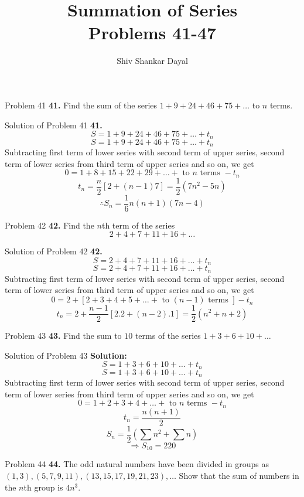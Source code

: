 \documentclass[aspectratio=1610,8pt]{beamer}
\title{Summation of Series\\Problems 41-47}
\author[Shiv Shankar Dayal]{Shiv Shankar Dayal}
\begin{document}
\begin{frame}
  \titlepage
\end{frame}
\begin{frame}{Problem 41}
  \textbf{41.} Find the sum of the series $1 + 9 + 24 + 46 + 75 + \ldots$ to $n$ terms.
\end{frame}
\begin{frame}{Solution of Problem 41}
  \textbf{41.} $$S = 1 + 9 + 24 + 46 + 75 + \ldots + t_n$$
  $$S = 1 + 9 + 24 + 46 + 75 + \ldots + t_n$$
  Subtracting first term of lower series with second term of upper series, second term of lower series from third term of upper
  series and so on, we get
  $$0= 1 + 8 + 15 + 22 + 29 + \ldots + \text{~to~}n\text{~terms~} - t_n$$
  $$t_n = \frac{n}{2}[2 + (n - 1)7] = \frac{1}{2}(7n^2 - 5n)$$
  $$\therefore S_n = \frac{1}{6}n(n + 1)(7n- 4)$$
\end{frame}
\begin{frame}{Problem 42}
  \textbf{42.} Find the $n$th term of the series $$2 + 4 + 7 + 11 + 16 + \ldots$$
\end{frame}
\begin{frame}{Solution of Problem 42}
  \textbf{42.} $$S = 2 + 4 + 7 + 11 + 16 + \ldots + t_n$$
  $$S = 2 + 4 + 7 + 11 + 16 + \ldots + t_n$$
  Subtracting first term of lower series with second term of upper series, second term of lower series from third term of upper
  series and so on, we get
  $$0 = 2 + [2 + 3 + 4 + 5 + \ldots + \text{~to~}(n - 1)\text{~terms~}] - t_n$$
  $$t_n = 2 + \frac{n - 1}{2}[2.2 + (n - 2).1] = \frac{1}{2}(n^2 + n + 2)$$
\end{frame}
\begin{frame}{Problem 43}
  \textbf{43.} Find the sum to $10$ terms of the series $1 + 3 + 6 + 10 + \ldots$
\end{frame}
\begin{frame}{Solution of Problem 43}
  \textbf{Solution:} $$S = 1 + 3 + 6 + 10 + \ldots + t_n$$
  $$S = 1 + 3 + 6 + 10 + \ldots + t_n$$
  Subtracting first term of lower series with second term of upper series, second term of lower series from third term of upper
  series and so on, we get
  $$0 = 1 + 2 + 3 + 4 + \ldots + \text{~to~}n\text{~terms~} - t_n$$
  $$t_n = \frac{n(n + 1)}{2}$$
  $$S_n = \frac{1}{2}\left(\sum n^2 + \sum n\right)$$
  $$\Rightarrow S_{10} = 220$$
\end{frame}
\begin{frame}{Problem 44}
  \textbf{44.} The odd natural numbers have been divided in groups as $(1, 3), (5, 7, 9, 11), (13, 15, 17, 19, 21, 23), \ldots$
  Show that the sum of numbers in the $n$th group is $4n^3.$
\end{frame}
\end{document}
